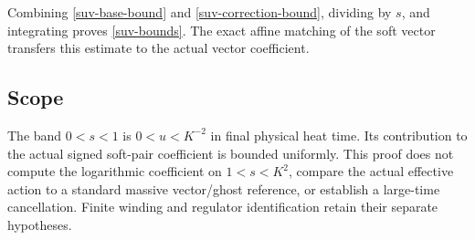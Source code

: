 Combining \eqref{suv-base-bound} and \eqref{suv-correction-bound},
dividing by $s$, and integrating proves \eqref{suv-bounds}.
The exact affine matching of the soft vector transfers this estimate
to the actual vector coefficient.

\subsection{Scope}
\label{suv-scope}

The band $0<s<1$ is $0<u<K^{-2}$ in final physical heat time.
Its contribution to the actual signed soft-pair coefficient is bounded
uniformly. This proof does not compute the logarithmic coefficient on
$1<s<K^2$, compare the actual effective action to a standard massive
vector/ghost reference, or establish a large-time cancellation.
Finite winding and regulator identification retain their separate
hypotheses.
